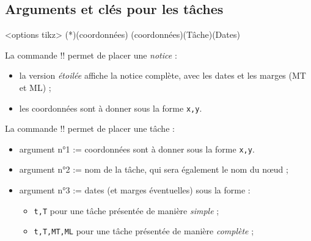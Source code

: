 \documentclass[french,a4paper,11pt]{article}
\begin{document}
{{\begin{DemoCode}[]
\begin{GrapheMPM}[Grille={14,5}]
\end{GrapheMPM}
\end{DemoCode}

\pagebreak

\subsection{Arguments et clés pour les tâches}

\begin{DemoCode}
\begin{GrapheMPM}[clés]<options tikz>
	\MPMPlaceNotice(*)(coordonnées)
	\MPMPlaceTache(coordonnées)(Tâche)(Dates)
\end{GrapheMPM}
\end{DemoCode}

\begin{tipblock}
La commande \motcletex!\MPMPlaceNotice! permet de placer une \textit{notice} :

\begin{itemize}
	\item la version \textit{étoilée} affiche la notice complète, avec les dates et les marges (MT et ML) ;
	\item les coordonnées sont à donner sous la forme \verb!x,y!.
\end{itemize}
\vspace*{-\baselineskip}\leavevmode
\end{tipblock}

\begin{tipblock}
La commande \motcletex!\MPMPlaceTache! permet de placer une tâche :

\begin{itemize}
	\item argument n°1 := coordonnées sont à donner sous la forme \verb!x,y!.
	\item argument n°2 := nom de la tâche, qui sera également le nom du nœud ;
	\item argument n°3 := dates (et marges éventuelles) sous la forme :
	\begin{itemize}
		\item \verb!t,T! pour une tâche présentée de manière \textit{simple} ;
		\item \verb!t,T,MT,ML! pour une tâche présentée de manière \textit{complète} ;
	\end{itemize}
\end{itemize}
\vspace*{-\baselineskip}\leavevmode
\end{tipblock}

}}
\end{document}
